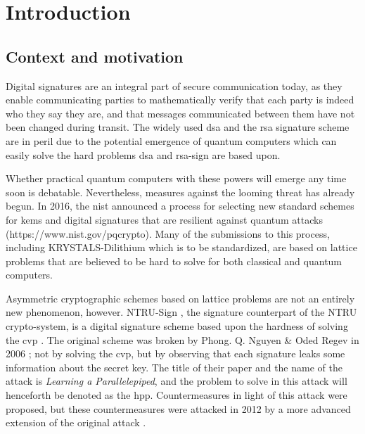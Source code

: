
\newcommand{\PP}[2][]{\mathcal{P}_{#1}(\mat{#2})}
\newcommand{\mat}[1]{\mathbf{#1}}
\renewcommand{\vec}[1]{\mathbf{#1}}
\newcommand{\GLnR}{\mathcal{GL}_{n}(\mathbb{R})}
\newcommand{\normdist}[2]{\mathcal{N}(#1, #2^2)}
\newcommand{\dgdist}{\mathcal{D}_{2\bb{Z}+c, \sigma}}
\newcommand{\bb}[1]{\mathbb{#1}}
\newcommand{\dgd}{\mathcal{D}}
\newcommand{\dgdi}{\widehat{\mathcal{D}}}
\newcommand{\mom}[2]{mom_{#1, \mathbf{#2}}(\mathbf{w})}


\chapter{Introduction}
\section{Context and motivation}
Digital signatures are an integral part of secure communication today, as they enable communicating parties to mathematically verify that each party is indeed who they say they are,
and that messages communicated between them have not been changed during transit. 
The widely used \gls{dsa} and the \gls{rsa} 
signature scheme are in peril due to the potential emergence of quantum computers which can easily solve the hard problems \gls{dsa} and \gls{rsa}-sign are based upon.

Whether practical quantum computers with these powers will emerge any time soon is debatable. Nevertheless, measures against the looming threat has already begun. 
In 2016, the \gls{nist} announced a process for selecting new standard schemes for \gls{kems} and 
digital signatures that are resilient against quantum attacks (https://www.nist.gov/pqcrypto). Many of the submissions to this process, including KRYSTALS-Dilithium which is to be standardized, 
are based on lattice problems that are believed to be hard to solve for both classical and quantum computers.

Asymmetric cryptographic schemes based on lattice problems are not an entirely new phenomenon, however. NTRU-Sign \cite{HHPSW03}, the signature counterpart of the NTRU crypto-system,
is a digital signature scheme based upon the hardness of solving the \gls{cvp} \cite{ENCYCLOPEDIA}.
The original scheme was broken by Phong. Q. Nguyen \& Oded Regev in 2006 \cite{NR09}; not by solving the \gls{cvp}, but by observing that each signature leaks some information about the secret key.
The title of their paper and the name of the attack is \textit{Learning a Parallelepiped}, and the problem to solve in this attack will henceforth be denoted as the \gls{hpp}. %
Countermeasures in light of this attack were proposed, but these countermeasures were attacked in 2012 by a more advanced extension of the original attack \cite{DN12}. 


